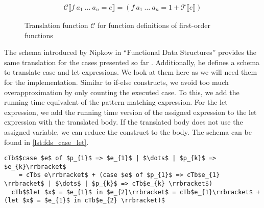 \begin{figure}
\begin{align*}
    \mathcal{C}\llbracket f\ a_{1}\ \dots\ a_{n} = e\rrbracket = (f\ a_{1}\ \dots\ a_{n} = 1 + \mathcal{T}\llbracket e \rrbracket)
\end{align*}
\caption{Translation function $\mathcal{C}$ for function definitions of first-order functions}
\label{fig:first_order_C}
\end{figure}

The schema introduced by Nipkow in ``Functional Data Structures'' provides the same translation for the cases presented so far \parencite{fds}.
Additionally, he defines a schema to translate case and let expressions.
We look at them here as we will need them for the implementation.
Similar to if-else constructs, we avoid too much overapproximation by only counting the executed case.
To this, we add the running time equivalent of the pattern-matching expression.
For the let expression, we add the running time version of the assigned expression to the let expression with the translated body.
If the translated body does not use the assigned variable, we can reduce the construct to the body.
The schema can be found in \autoref{lst:fds_case_let}.
\begin{lstlisting}[language=translation,label=lst:fds_case_let,caption=Translation schema for case- and let-expression by Nipkow,mathescape=true]
  cTb$$case $e$ of $p_{1}$ => $e_{1}$ | $\dots$ | $p_{k}$ => $e_{k}\rrbracket$
    = cTb$ e\rrbracket$ + (case $e$ of $p_{1}$ => cTb$e_{1} \rrbracket$ | $\dots$ | $p_{k}$ => cTb$e_{k} \rrbracket$)
  cTb$$let $x$ = $e_{1}$ in $e_{2}\rrbracket$ = cTb$e_{1}\rrbracket$ + (let $x$ = $e_{1}$ in cTb$e_{2} \rrbracket)$
\end{lstlisting}

